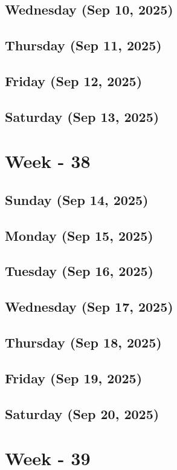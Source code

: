 \subsection*{Wednesday (Sep 10, 2025)}
\subsection*{Thursday (Sep 11, 2025)}
\subsection*{Friday (Sep 12, 2025)}
\subsection*{Saturday (Sep 13, 2025)}

\section{Week - 38}
\subsection*{Sunday (Sep 14, 2025)}
\subsection*{Monday (Sep 15, 2025)}
\subsection*{Tuesday (Sep 16, 2025)}
\subsection*{Wednesday (Sep 17, 2025)}
\subsection*{Thursday (Sep 18, 2025)}
\subsection*{Friday (Sep 19, 2025)}
\subsection*{Saturday (Sep 20, 2025)}

\section{Week - 39}
